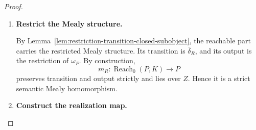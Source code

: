 \begin{proof}
\begin{enumerate}
        Define
        \[
            \chi_{P,K}:
            A_1\times_{t_A,A_0,p_{D_K}}D_K
            \to
            D_K
        \]
        by
        \[
            \chi_{P,K}(c,(a,\kappa))
            =
            (a\circ c,\kappa).
        \]
        The Mealy multiplication law for \(\delta_P\) gives
        \[
            g e'_R
            =
            m_Re_R\chi_{P,K}.
        \]
        In generalized-element notation,
        \[
            \begin{aligned}
                g e'_R(c,a,\kappa)
                &=
                \delta_P(c,m_Re_R(a,\kappa))
                \\
                &=
                \delta_P(c,\rho_{P,K}(a,\kappa))
                \\
                &=
                \delta_P(c,\delta_P(a,i(\kappa)))
                \\
                &=
                \delta_P(a\circ c,i(\kappa))
                \\
                &=
                \rho_{P,K}(a\circ c,\kappa)
                \\
                &=
                m_Re_R\chi_{P,K}(c,a,\kappa).
            \end{aligned}
        \]
        Hence \(ge'_R\) factors through \(m_R\). Since \(e'_R\) is a regular
        epimorphism and \(m_R\) is monic,
        Lemma~\ref{lem:regular-epi-descent-subobjects} supplies a unique map
        \[
            \bar\delta_R:
            A_1
            \times_{t_A,A_0,p_{\operatorname{Reach}}}
            \operatorname{Reach}_0(P,K)
            \to
            \operatorname{Reach}_0(P,K)
        \]
        such that
        \[
            m_R\bar\delta_R=g.
        \]
        Thus \(m_R\) is transition-closed.

        \item \textbf{Restrict the Mealy structure.}

        By Lemma~\ref{lem:restriction-transition-closed-subobject}, the
        reachable part carries the restricted Mealy structure. Its transition
        is \(\bar\delta_R\), and its output is the restriction of
        \(\omega_P\). By construction,
        \[
            m_R:
            \operatorname{Reach}_0(P,K)\to P
        \]
        preserves transition and output strictly and lies over \(Z\).
        Hence it is a strict semantic Mealy homomorphism.

        \item \textbf{Construct the realization map.}


\end{enumerate}
\end{proof}
